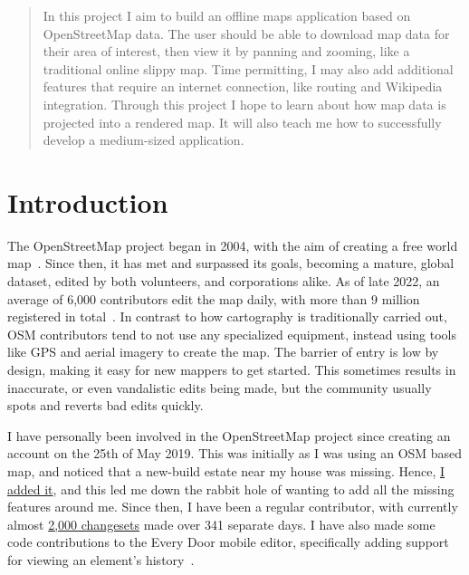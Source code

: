 \documentclass[]{final_report}
\begin{document}
\maketitle


\tableofcontents{}\newpage


\begin{abstract}

In this project I aim to build an offline maps application based on OpenStreetMap data. The user should be able to download map data for their area of interest, then view it by panning and zooming, like a traditional online slippy map. Time permitting, I may also add additional features that require an internet connection, like routing and Wikipedia integration. Through this project I hope to learn about how map data is projected into a rendered map. It will also teach me how to successfully develop a medium-sized application.

\end{abstract}

\chapter{Introduction}

The OpenStreetMap project began in 2004, with the aim of creating a free world map~\cite{RAMM:2011}. Since then, it has met and surpassed its goals, becoming a mature, global dataset, edited by both volunteers, and corporations alike. As of late 2022, an average of 6,000 contributors edit the map daily, with more than 9 million registered in total~\cite{OSMStats}. In contrast to how cartography is traditionally carried out, OSM contributors tend to not use any specialized equipment, instead using tools like GPS and aerial imagery to create the map. The barrier of entry is low by design, making it easy for new mappers to get started. This sometimes results in inaccurate, or even vandalistic edits being made, but the community usually spots and reverts bad edits quickly.

I have personally been involved in the OpenStreetMap project since creating an account on the 25th of May 2019. This was initially as I was using an OSM based map, and noticed that a new-build estate near my house was missing. Hence, \href{https://www.openstreetmap.org/changeset/70609319}{I added it}, and this led me down the rabbit hole of wanting to add all the missing features around me. Since then, I have been a regular contributor, with currently almost \href{https://www.openstreetmap.org/user/GeorgeHoneywood}{2,000 changesets} made over 341 separate days. I have also made some code contributions to the Every Door mobile editor, specifically adding support for viewing an element's history~\cite{every-door}. 
\end{document}
